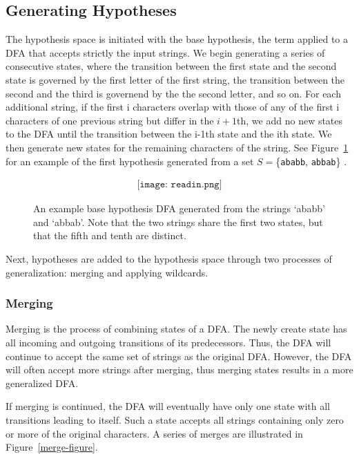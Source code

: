 \documentclass[10pt,letterpaper]{article}
\begin{document}
\subsection{Generating Hypotheses}
The hypothesis space is initiated with the base hypothesis, the term applied to a DFA that accepts strictly the input strings. We begin generating a series of consecutive states, where the transition between the first state and the second state is governed by the first letter of the first string, the transition between the second and the third is governend by the the second letter, and so on. For each additional string, if the first i characters overlap with those of any of the first i characters of one previous string but differ in the $i+1$th, we add no new states to the DFA until the transition between the i-1th state and the ith state. We then generate new states for the remaining characters of the string. See Figure~\ref{base_hypothesis} for an example of the first hypothesis generated from a set $S = $\{\verb!ababb!, \verb!abbab!\} .
  \begin{figure}[ht]
\begin{center}
\begin{align*}
\texttt{[image: readin.png]}
\end{align*}
\end{center}
\caption{An example base hypothesis DFA generated from the strings `ababb' and `abbab'. Note that the two strings share the first two states, but that the fifth and tenth are distinct.} 
\label{base_hypothesis}
\end{figure}

Next, hypotheses are added to the hypothesis space through two processes of generalization: merging and applying wildcards.
 

\subsubsection{Merging} Merging is the process of combining states of a DFA. The newly create state has all incoming and outgoing transitions of its predecessors. Thus, the DFA will continue to accept the same set of strings as the original DFA. However, the DFA will often accept more strings after merging, thus merging states results in a more generalized DFA.

If merging is continued, the DFA will eventually have only one state with all transitions leading to itself. Such a state accepts all strings containing only zero or more of the original characters. A series of merges are illustrated in Figure~\ref{merge-figure}.
\end{document}
